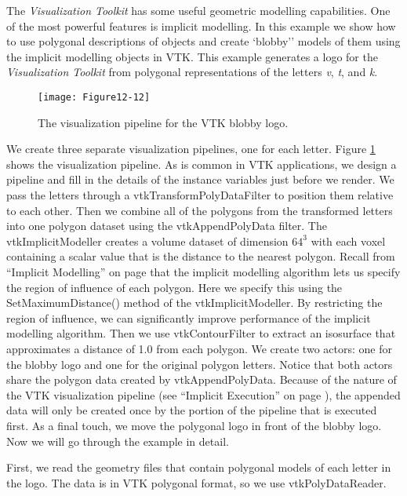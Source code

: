 The \emph{Visualization Toolkit} has some useful geometric modelling capabilities. One of the most powerful features is implicit modelling. In this example we show how to use polygonal descriptions of objects and create `blobby'' models of them using the implicit modelling objects in VTK. This example generates a logo for the \emph{Visualization Toolkit} from polygonal representations of the letters \emph{v}, \emph{t}, and \emph{k}.

\begin{figure}[!htb]
	\centering
	\texttt{[image: Figure12-12]}
	\caption{The visualization pipeline for the VTK blobby logo.}
	\label{fig:Figure12-12}
\end{figure}

We create three separate visualization pipelines, one for each letter. Figure \ref{fig:Figure12-12} shows the visualization pipeline.
As is common in VTK applications, we design a pipeline and fill in the details of the instance variables just before we render.
We pass the letters through a vtkTransformPolyDataFilter to position them relative to each other.
Then we combine all of the polygons from the transformed letters into one polygon dataset using the vtkAppendPolyData filter.
The vtkImplicitModeller creates a volume dataset of dimension $64^3$ with each voxel containing a scalar value that is the distance to the nearest polygon.
Recall from ``Implicit Modelling'' on page \pageref{subsec:implicit_modelling} that the implicit modelling algorithm lets us specify the region of influence of each polygon. Here we specify this using the SetMaximumDistance() method of the vtkImplicitModeller.
By restricting the region of influence, we can significantly improve performance of the implicit modelling algorithm.
Then we use vtkContourFilter to extract an isosurface that approximates a distance of 1.0 from each polygon.
We create two actors: one for the blobby logo and one for the original polygon letters.
Notice that both actors share the polygon data created by vtkAppendPolyData. Because of the nature of the VTK visualization pipeline (see ``Implicit Execution'' on page \pageref{subsec:implicit_execution} ), the appended data will only be created once by the portion of the pipeline that is executed first.
As a final touch, we move the polygonal logo in front of the blobby logo. Now we will go through the example in detail.

First, we read the geometry files that contain polygonal models of each letter in the logo. The data is in VTK polygonal format, so we use vtkPolyDataReader.

